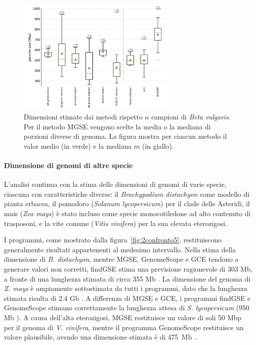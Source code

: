 \documentclass[crop=false, class=book]{standalone}
\begin{document}
	\begin{figure}[]
		\centering
		\includegraphics[width=0.7\textwidth]{capitoli/analisi/confronto/confronto2/3.png}
		\caption{Dimensioni stimate dai metodi rispetto $n$ campioni di \textit{Beta vulgaris}. Per il metodo MGSE vengono scelte la media o la mediana di porzioni diverse di genoma. La figura mostra per ciascun metodo il valor medio (in verde) e la mediana $m$ (in giallo).}
		\label{fig:2confronto4}
	\end{figure} 

	\paragraph{Dimensione di genomi di altre specie}
	L'analisi continua con la stima delle dimensioni di genomi di varie specie, ciascuna con caratteristiche diverse: il \textit{Brachypodium distachyon} come modello di pianta erbacea, il pomodoro (\textit{Solanum lycopersicum}) per il clade delle Asteridi, il mais (\textit{Zea mays}) è stato incluso come specie monocotiledone ad alto contenuto di trasposoni, e la vite comune (\textit{Vitis vinifera}) per la sua elevata eterozigosi.
	
	I programmi, come mostrato dalla figura~\vref{fig:2confronto5}, restituiscono generalmente risultati appartenenti al medesimo intervallo. Nella stima della dimensione di \textit{B. distachyon}, mentre MGSE, GenomeScope e GCE tendono a generare valori non corretti, findGSE stima una previsione ragionevole di 303 Mb, a fronte di una lunghezza stimata di circa 355 Mb \cite{ozdemir2008brachypodium}. 
	La dimensione del genoma di \textit{Z. mays} è ampiamente sottostimata da tutti i programmi, dato che la lunghezza stimata risulta di 2.4 Gb \cite{haberer2005structure}. 
	A differenza di MGSE e GCE, i programmi findGSE e GenomeScope stimano correttamente la lunghezza attesa di \textit{S. lycopersicum} (950 Mb \cite{barone2008structural}).	
	A causa dell'alta eterozigosi, MGSE restituisce un valore di soli 50 Mbp per il genoma di \textit{V. vinifera}, mentre il programma GenomeScope restituisce un valore plausibile, avendo una dimensione stimata è di 475~Mb~\cite{myles2010rapid}.
\end{document}
